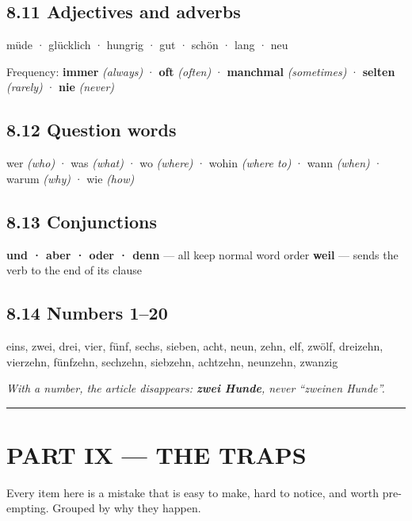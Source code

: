 \documentclass[
  11pt,
]{article}
\begin{document}
\subsection{8.11 Adjectives and adverbs}\label{adjectives-and-adverbs}

müde · glücklich · hungrig · gut · schön · lang · neu

Frequency: \textbf{immer} \emph{(always)} · \textbf{oft} \emph{(often)}
· \textbf{manchmal} \emph{(sometimes)} · \textbf{selten} \emph{(rarely)}
· \textbf{nie} \emph{(never)}

\subsection{8.12 Question words}\label{question-words}

wer \emph{(who)} · was \emph{(what)} · wo \emph{(where)} · wohin
\emph{(where to)} · wann \emph{(when)} · warum \emph{(why)} · wie
\emph{(how)}

\subsection{8.13 Conjunctions}\label{conjunctions}

\textbf{und · aber · oder · denn} --- all keep normal word order
\textbf{weil} --- sends the verb to the end of its clause

\subsection{8.14 Numbers 1--20}\label{numbers-120}

eins, zwei, drei, vier, fünf, sechs, sieben, acht, neun, zehn, elf,
zwölf, dreizehn, vierzehn, fünfzehn, sechzehn, siebzehn, achtzehn,
neunzehn, zwanzig

\emph{With a number, the article disappears: \textbf{zwei Hunde}, never
``zweinen Hunde''.}

\begin{center}\rule{0.5\linewidth}{0.5pt}\end{center}

\section{PART IX --- THE TRAPS}\label{part-ix-the-traps}

Every item here is a mistake that is easy to make, hard to notice, and
worth pre-empting. Grouped by why they happen.
\end{document}
